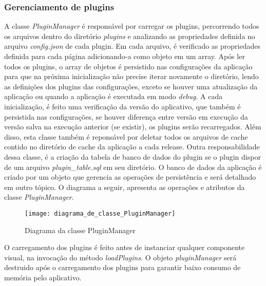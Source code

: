 \subsubsection{Gerenciamento de plugins}\label{sec:solucao-desenvolvida}
A classe \textit{PluginManager} é responsável por carregar os plugins, percorrendo todos os arquivos dentro do diretório \textit{plugins} e analizando as propriedades definida no arquivo \textit{config.json} de cada plugin. Em cada arquivo, é verificado as propriedades definida para cada página adicionando-a como objeto em um array. Após ler todos os plugins, o array de objetos é persistido nas configurações da aplicação para que na próxima inicialização não precise iterar novamente o diretório, lendo as definições dos plugins das configurações, exceto se houver uma atualização da aplicação ou quando a aplicação é executada em modo \textit{debug}. A cada inicialização, é feito uma verificação da versão do aplicativo, que também é persistida nas configurações, se houver diferença entre versão em execução da versão salva na execução anterior (se existir), os plugins serão recarregados. Além disso, esta classe também é reponsável por deletar todos os arquivos de cache contido no diretório de cache da aplicação a cada release. Outra responsabilidade dessa classe, é a criação da tabela de banco de dados do plugin se o plugin dispor de um arquivo \textit{plugin\_table.sql} em seu diretório. O banco de dados da aplicação é criado por um objeto que gerencia as operações de persistência e será detalhado em outro tópico. O diagrama a seguir, apresenta as operações e atributos da classe \textit{PluginManager}.

\begin{figure}[H]
	\texttt{[image: diagrama\_de\_classe\_PluginManager]}
	\centering
	\caption{Diagrama da classe PluginManager}
\end{figure}

O carregamento dos plugins é feito antes de instanciar qualquer componente visual, na invocação do método \textit{loadPlugins}. O objeto \textit{pluginManager} será destruido após o carregamento dos plugins para garantir baixo consumo de memória pelo aplicativo.


